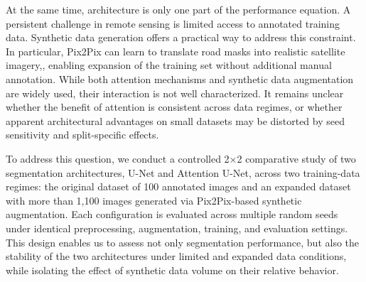 \documentclass[conference]{IEEEtran}
\begin{document}

At the same time, architecture is only one part of the performance equation. A persistent challenge in remote sensing is limited access to annotated training data. Synthetic data generation offers a practical way to address this constraint. In particular, Pix2Pix can learn to translate road masks into realistic satellite imagery,\cite{b3}, enabling expansion of the training set without additional manual annotation. While both attention mechanisms and synthetic data augmentation are widely used, their interaction is not well characterized. It remains unclear whether the benefit of attention is consistent across data regimes, or whether apparent architectural advantages on small datasets may be distorted by seed sensitivity and split-specific effects.

To address this question, we conduct a controlled 2×2 comparative study of two segmentation architectures, U-Net and Attention U-Net, across two training-data regimes: the original dataset of 100 annotated images and an expanded dataset with more than 1,100 images generated via Pix2Pix-based synthetic augmentation. Each configuration is evaluated across multiple random seeds under identical preprocessing, augmentation, training, and evaluation settings. This design enables us to assess not only segmentation performance, but also the stability of the two architectures under limited and expanded data conditions, while isolating the effect of synthetic data volume on their relative behavior.

\end{document}
